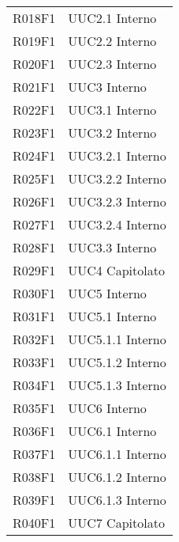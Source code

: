 \documentclass[../analisi-dei-requisiti.tex]{subfiles}
\begin{document}
\begin{longtable}[H]{ p{4cm} | p{4cm} }
  R018F1                               & UUC2.1 Interno                \\
  R019F1                               & UUC2.2 Interno                \\
  R020F1                               & UUC2.3 Interno                \\
  R021F1                               & UUC3 Interno                  \\
  R022F1                               & UUC3.1 Interno                \\
  R023F1                               & UUC3.2 Interno                \\
  R024F1                               & UUC3.2.1 Interno              \\
  R025F1                               & UUC3.2.2 Interno              \\
  R026F1                               & UUC3.2.3 Interno              \\
  R027F1                               & UUC3.2.4 Interno              \\
  R028F1                               & UUC3.3 Interno                \\
  R029F1                               & UUC4 Capitolato               \\
  R030F1                               & UUC5 Interno                  \\
  R031F1                               & UUC5.1 Interno                \\
  R032F1                               & UUC5.1.1 Interno              \\
  R033F1                               & UUC5.1.2 Interno              \\
  R034F1                               & UUC5.1.3 Interno              \\
  R035F1                               & UUC6 Interno                  \\
  R036F1                               & UUC6.1 Interno                \\
  R037F1                               & UUC6.1.1 Interno              \\
  R038F1                               & UUC6.1.2 Interno              \\
  R039F1                               & UUC6.1.3 Interno              \\
  R040F1                               & UUC7 Capitolato               \\

\end{longtable}
\end{document}
